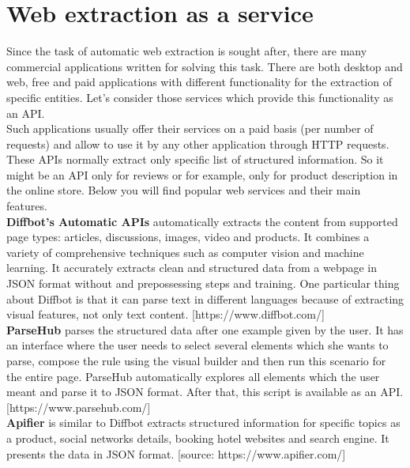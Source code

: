 \section{Web extraction as a service}

Since the task of automatic web extraction is sought after, there are many commercial applications written for solving this task. There are both desktop and web, free and paid applications with different functionality for the extraction of specific entities. Let's consider those services which provide this functionality as an API.\\

Such applications usually offer their services on a paid basis (per number of requests) and allow to use it by any other application through HTTP requests. These APIs normally extract only specific list of structured information. So it might be an API only for reviews or for example, only for product description in the online store. Below you will find popular web services and their main features.\\

\noindent \textbf{Diffbot's Automatic APIs} automatically extracts the content from supported page types: articles, discussions, images, video and products. It combines a variety of comprehensive techniques such as computer vision and machine learning. It accurately extracts clean and structured data from a webpage in JSON format without and prepossessing steps and training. One particular thing about Diffbot is that it can parse text in different languages because of extracting visual features, not only text content. \cite{Diffbot} [https://www.diffbot.com/]\\

\noindent\textbf{ParseHub} parses the structured data after one example given by the user. It has an interface where the user needs to select several elements which she wants to parse, compose the rule using the visual builder and then run this scenario for the entire page. ParseHub automatically explores all elements which the user meant and parse it to JSON format. After that, this script is available as an API.    
\cite{ParseHub} [https://www.parsehub.com/]\\

\noindent\textbf{Apifier} is similar to Diffbot extracts structured information for specific topics as a product, social networks details, booking hotel websites and search engine. It presents the data in JSON format. 
\cite{Apifier} [source: https://www.apifier.com/] \\

